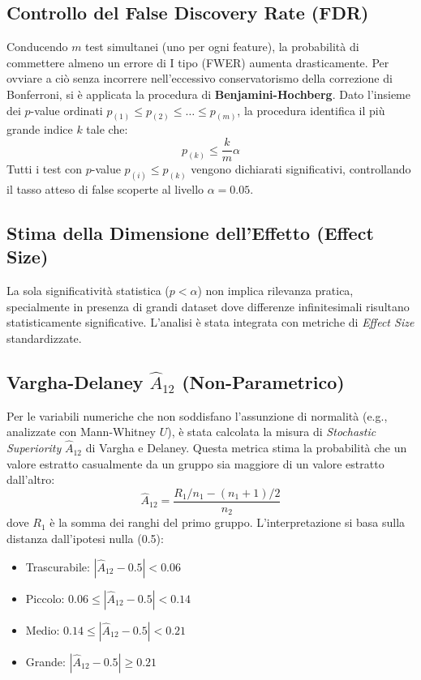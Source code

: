 \subsection{Controllo del False Discovery Rate (FDR)}
Conducendo $m$ test simultanei (uno per ogni feature), la probabilità di commettere almeno un errore di I tipo (FWER) aumenta drasticamente. Per ovviare a ciò senza incorrere nell'eccessivo conservatorismo della correzione di Bonferroni, si è applicata la procedura di \textbf{Benjamini-Hochberg}.
\noindent
Dato l'insieme dei $p$-value ordinati $p_{(1)} \le p_{(2)} \le \dots \le p_{(m)}$, la procedura identifica il più grande indice $k$ tale che:
\begin{equation}
    p_{(k)} \le \frac{k}{m} \alpha
\end{equation}
Tutti i test con $p$-value $p_{(i)} \le p_{(k)}$ vengono dichiarati significativi, controllando il tasso atteso di false scoperte al livello $\alpha=0.05$.

\subsection{Stima della Dimensione dell'Effetto (Effect Size)}

La sola significatività statistica ($p < \alpha$) non implica rilevanza pratica, specialmente in presenza di grandi dataset dove differenze infinitesimali risultano statisticamente significative. L'analisi è stata integrata con metriche di \textit{Effect Size} standardizzate.

\subsection{Vargha-Delaney $\hat{A}_{12}$ (Non-Parametrico)}
Per le variabili numeriche che non soddisfano l'assunzione di normalità (e.g., analizzate con Mann-Whitney $U$), è stata calcolata la misura di \textit{Stochastic Superiority} $\hat{A}_{12}$ di Vargha e Delaney. Questa metrica stima la probabilità che un valore estratto casualmente da un gruppo sia maggiore di un valore estratto dall'altro:
\begin{equation}
    \hat{A}_{12} = \frac{R_1/n_1 - (n_1+1)/2}{n_2}
\end{equation}
dove $R_1$ è la somma dei ranghi del primo gruppo. L'interpretazione si basa sulla distanza dall'ipotesi nulla (0.5):
\begin{itemize}
    \item Trascurabile: $| \hat{A}_{12} - 0.5 | < 0.06$
    \item Piccolo: $0.06 \le | \hat{A}_{12} - 0.5 | < 0.14$
    \item Medio: $0.14 \le | \hat{A}_{12} - 0.5 | < 0.21$
    \item Grande: $| \hat{A}_{12} - 0.5 | \ge 0.21$
\end{itemize}

